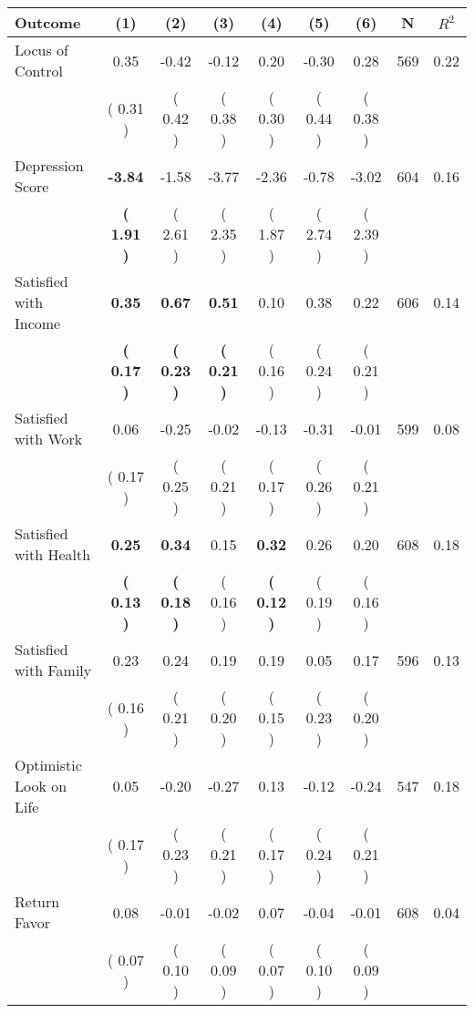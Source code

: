 \begin{tabular}{lcccccccc}
\toprule
 \textbf{Outcome} & \textbf{(1)} & \textbf{(2)} & \textbf{(3)} & \textbf{(4)} & \textbf{(5)} & \textbf{(6)} & \textbf{N} & \textbf{$ R^2$} \\
\midrule
Locus of Control &      0.35 &     -0.42 &     -0.12 &      0.20 &     -0.30 &      0.28 & 569 &       0.22 \\ 
 & (     0.31 ) & (     0.42 ) & (     0.38 ) & (     0.30 ) & (     0.44 ) & (     0.38 ) & \\
Depression Score & \textbf{    -3.84} &     -1.58 &     -3.77 &     -2.36 &     -0.78 &     -3.02 & 604 &       0.16 \\ 
 & \textbf{(     1.91 )} & (     2.61 ) & (     2.35 ) & (     1.87 ) & (     2.74 ) & (     2.39 ) & \\
Satisfied with Income & \textbf{     0.35} & \textbf{     0.67} & \textbf{     0.51} &      0.10 &      0.38 &      0.22 & 606 &       0.14 \\ 
 & \textbf{(     0.17 )} & \textbf{(     0.23 )} & \textbf{(     0.21 )} & (     0.16 ) & (     0.24 ) & (     0.21 ) & \\
Satisfied with Work &      0.06 &     -0.25 &     -0.02 &     -0.13 &     -0.31 &     -0.01 & 599 &       0.08 \\ 
 & (     0.17 ) & (     0.25 ) & (     0.21 ) & (     0.17 ) & (     0.26 ) & (     0.21 ) & \\
Satisfied with Health & \textbf{     0.25} & \textbf{     0.34} &      0.15 & \textbf{     0.32} &      0.26 &      0.20 & 608 &       0.18 \\ 
 & \textbf{(     0.13 )} & \textbf{(     0.18 )} & (     0.16 ) & \textbf{(     0.12 )} & (     0.19 ) & (     0.16 ) & \\
Satisfied with Family &      0.23 &      0.24 &      0.19 &      0.19 &      0.05 &      0.17 & 596 &       0.13 \\ 
 & (     0.16 ) & (     0.21 ) & (     0.20 ) & (     0.15 ) & (     0.23 ) & (     0.20 ) & \\
Optimistic Look on Life &      0.05 &     -0.20 &     -0.27 &      0.13 &     -0.12 &     -0.24 & 547 &       0.18 \\ 
 & (     0.17 ) & (     0.23 ) & (     0.21 ) & (     0.17 ) & (     0.24 ) & (     0.21 ) & \\
Return Favor &      0.08 &     -0.01 &     -0.02 &      0.07 &     -0.04 &     -0.01 & 608 &       0.04 \\ 
 & (     0.07 ) & (     0.10 ) & (     0.09 ) & (     0.07 ) & (     0.10 ) & (     0.09 ) & \\

\end{tabular}
